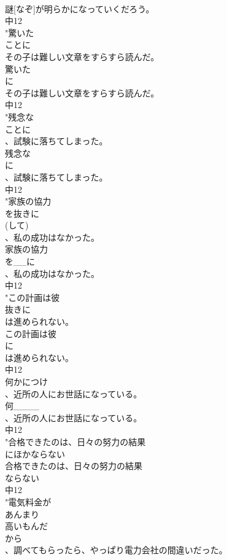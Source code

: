 \documentclass[8pt]{extreport}
\begin{document}
\begin{CJK}{UTF8}{min}
\\	謎[なぞ]が明らかになっていくだろう。
\\	中12
\\	"驚いた
\\	ことに
\\	その子は難しい文章をすらすら読んだ。
\\	驚いた
\\	に
\\	その子は難しい文章をすらすら読んだ。
\\	中12
\\	"残念な
\\	ことに
\\	、試験に落ちてしまった。
\\	残念な
\\	に
\\	、試験に落ちてしまった。
\\	中12
\\	"家族の協力
\\	を抜きに
\\	(して)
\\	、私の成功はなかった。
\\	家族の協力
\\	を__に
\\	、私の成功はなかった。
\\	中12
\\	"この計画は彼
\\	抜きに
\\	は進められない。
\\	この計画は彼
\\	に
\\	は進められない。
\\	中12
\\	何かにつけ
\\	、近所の人にお世話になっている。
\\	何____
\\	、近所の人にお世話になっている。
\\	中12
\\	"合格できたのは、日々の努力の結果
\\	にほかならない
\\	合格できたのは、日々の努力の結果
\\	ならない
\\	中12
\\	"電気料金が
\\	あんまり
\\	高いもんだ
\\	から
\\	、調べてもらったら、やっぱり電力会社の間違いだった。

\end{CJK}
\end{document}
